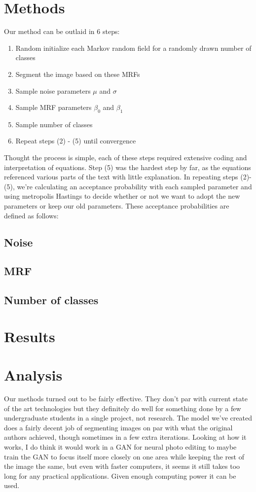 \documentclass[11pt]{article}
\begin{document}
\section{Methods}
Our method can be outlaid in 6 steps:

\begin{enumerate}
	\item Random initialize each Markov random field for a randomly drawn number of classes
	\item Segment the image based on these MRFs
	\item Sample noise parameters $\mu$ and $\sigma$
	\item Sample MRF parameters $\beta_0$ and $\beta_1$
	\item Sample number of classes
	\item Repeat steps (2) - (5) until convergence
\end{enumerate}
Thought the process is simple, each of these steps required extensive coding and interpretation of equations. Step (5) was the hardest step by far, as the equations referenced various parts of the text with little explanation. In repeating steps (2)-(5), we’re calculating an acceptance probability with each sampled parameter and using metropolis Hastings to decide whether or not we want to adopt the new parameters or keep our old parameters. These acceptance probabilities are defined as follows:

\subsection{Noise}

\subsection{MRF}
\subsection{Number of classes}

\section{Results}


\section{Analysis}
Our methods turned out to be fairly effective. They don’t par with current state of the art technologies but they definitely do well for something done by a few undergraduate students in a single project, not research. The model we’ve created does a fairly decent job of segmenting images on par with what the original authors achieved, though sometimes in a few extra iterations. Looking at how it works, I do think it would work in a GAN for neural photo editing to maybe train the GAN to focus itself more closely on one area while keeping the rest of the image the same, but even with faster computers, it seems it still takes too long for any practical applications. Given enough computing power it can be used. 
\end{document}
